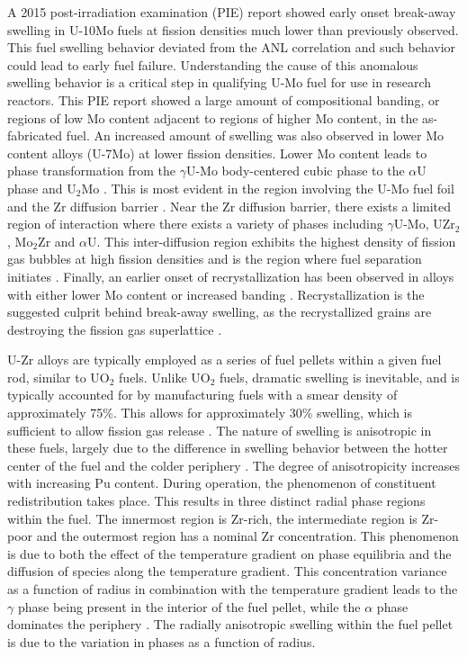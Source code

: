 \documentclass[review]{elsarticle}
\begin{document}
A 2015 post-irradiation examination (PIE) report \cite{afip6report} showed early onset break-away swelling in U-10Mo fuels at fission densities much lower than previously observed. This fuel swelling behavior deviated from the ANL correlation and such behavior could lead to early fuel failure. Understanding the cause of this anomalous swelling behavior is a critical step in qualifying U-Mo fuel for use in research reactors. This PIE report showed a large amount of compositional banding, or regions of low Mo content adjacent to regions of higher Mo content, in the as-fabricated fuel. An increased amount of swelling was also observed in lower Mo content alloys (U-7Mo) \cite{vandenberghe2014} at lower fission densities. Lower Mo content leads to phase transformation from the $\gamma$U-Mo body-centered cubic phase to the $\alpha$U phase and U$_{2}$Mo \cite{janfong2014}. This is most evident in the region involving the U-Mo fuel foil and the Zr diffusion barrier \cite{park2015}. Near the Zr diffusion barrier, there exists a limited region of interaction where there exists a variety of phases including $\gamma$U-Mo, UZr$_{2}$, Mo$_{2}$Zr and $\alpha$U. This inter-diffusion region exhibits the highest density of fission gas bubbles at high fission densities and is the region where fuel separation initiates \cite{rertr12}. Finally, an earlier onset of recrystallization has been observed in alloys with either lower Mo content or increased banding \cite{kim2013A}. Recrystallization is the suggested culprit behind break-away swelling, as the recrystallized grains are destroying the fission gas superlattice \cite{vandenberghe2008}. 

U-Zr alloys are typically employed as a series of fuel pellets within a given fuel rod, similar to UO$_{2}$ fuels. Unlike UO$_{2}$ fuels, dramatic swelling is inevitable, and is typically accounted for by manufacturing fuels with a smear density of approximately 75{\%}. This allows for approximately 30\% swelling, which is sufficient to allow fission gas release \cite{beck1968}. The nature of swelling is anisotropic in these fuels, largely due to the difference in swelling behavior between the hotter center of the fuel and the colder periphery \cite{hofman1990}. The degree of anisotropicity increases with increasing Pu content. During operation, the phenomenon of constituent redistribution takes place. This results in three distinct radial phase regions within the fuel. The innermost region is Zr-rich, the intermediate region is Zr-poor and the outermost region has a nominal Zr concentration. This phenomenon is due to both the effect of the temperature gradient on phase equilibria and the diffusion of species along the temperature gradient. This concentration variance as a function of radius in combination with the temperature gradient leads to the $\gamma$ phase being present in the interior of the fuel pellet, while the $\alpha$ phase dominates the periphery \cite{kobayashi1990, kim2004}. The radially anisotropic swelling within the fuel pellet is due to the variation in phases as a function of radius.
\end{document}
